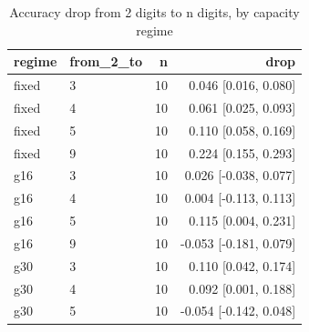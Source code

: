 \begin{table}[t]
\centering
\small
\begin{tabular}{llrr}
\toprule
regime & from\_2\_to & n & drop \\
\midrule
fixed & 3 & 10 & 0.046 [0.016, 0.080] \\
fixed & 4 & 10 & 0.061 [0.025, 0.093] \\
fixed & 5 & 10 & 0.110 [0.058, 0.169] \\
fixed & 9 & 10 & 0.224 [0.155, 0.293] \\
g16 & 3 & 10 & 0.026 [-0.038, 0.077] \\
g16 & 4 & 10 & 0.004 [-0.113, 0.113] \\
g16 & 5 & 10 & 0.115 [0.004, 0.231] \\
g16 & 9 & 10 & -0.053 [-0.181, 0.079] \\
g30 & 3 & 10 & 0.110 [0.042, 0.174] \\
g30 & 4 & 10 & 0.092 [0.001, 0.188] \\
g30 & 5 & 10 & -0.054 [-0.142, 0.048] \\
\bottomrule
\end{tabular}
\caption{Accuracy drop from 2 digits to n digits, by capacity regime}
\label{tab:capacity_drop}
\end{table}